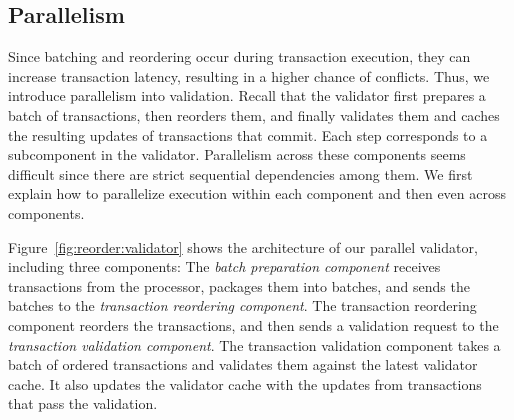 

\subsection{Parallelism}
\label{sec:parallel}
\label{sec:validator_reordering:parallel}


Since batching and reordering occur during transaction execution, they can increase transaction latency, 
resulting in a higher chance of conflicts. Thus, we introduce parallelism into validation.
Recall that the validator first prepares a batch of transactions, then reorders them,  
and finally validates them and caches the resulting updates of transactions that commit.
 Each step corresponds to a subcomponent in the validator. Parallelism across these components seems difficult since there are strict sequential dependencies among them. We first explain how to parallelize execution within each component and then even across components.


Figure~\ref{fig:reorder:validator} shows the architecture of our parallel validator, including three components: 
The \emph{batch preparation component} receives transactions from the processor, packages them into batches, and sends the batches to the \emph{transaction reordering component}. The transaction reordering component reorders the transactions, and then sends a validation request to the \emph{transaction validation component}. The transaction validation component takes a batch of ordered 
transactions
and validates them against the latest validator cache. It also updates the validator cache with the updates from transactions that pass the validation. 

